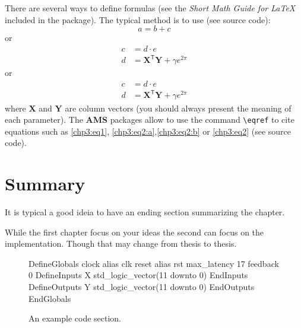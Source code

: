 \documentclass[defaultstyle,10pt,master,Helvetica]{thesis}
\begin{document}
There are several ways to define formulas (see the \textit{Short Math Guide for LaTeX} included in the package). The typical method is to use (see source code): 
\begin{equation}
a= b + c
\end{equation}
or
\begin{align}
c &= d \cdot e \nonumber\\
d &= \mathbf{X}^{\mathsf{T}} \mathbf{Y}+ \gamma e^{2\pi}
\label{chp3:eq1} 
\end{align}
or
\begin{subequations}
\begin{align}
c &= d \cdot e \label{chp3:eq2:a} \\
d &= \mathbf{X}^{\mathsf{T}} \mathbf{Y} + \gamma e^{2\pi}
\label{chp3:eq2:b} 
\end{align}
\label{chp3:eq2} 
\end{subequations}
where $\mathbf{X}$ and $\mathbf{Y}$ are column vectors (you should always present the meaning of each parameter). The \textbf{AMS} packages allow to use the command \verb"\eqref" to cite equations such as \eqref{chp3:eq1},  \eqref{chp3:eq2:a},\eqref{chp3:eq2:b} or \eqref{chp3:eq2} (see source code).

\section{Summary}

It is typical a good ideia to have an ending section summarizing the chapter.

\cleardoublepage

While the first chapter focus on your ideas the second can focus on the implementation. Though that may change from thesis to thesis.

\begin{figure}
\begin{boxedverbatim}
DefineGlobals
   clock   alias   clk
   reset   alias   rst
   max_latency     17
   feedback        0
   DefineInputs
      X   std_logic_vector(11 downto 0)
   EndInputs
   DefineOutputs
      Y   std_logic_vector(11 downto 0)
   EndOutputs
EndGlobals
\end{boxedverbatim}
\caption{An example code section.}
\label{chp4:img}
\end{figure}
\end{document}
